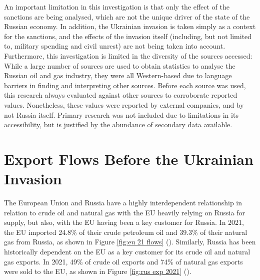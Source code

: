 \documentclass[12pt]{article}
\begin{document}
 An important limitation in this investigation is that only the effect of the sanctions are being analysed, which are not the unique driver of the state of the Russian economy. In addition, the Ukrainian invasion is taken simply as a context for the sanctions, and the effects of the invasion itself (including, but not limited to, military spending and civil unrest) are not being taken into account. Furthermore, this investigation is limited in the diversity of the sources accessed: While a large number of sources are used to obtain statistics to analyse the Russian oil and gas industry, they were all Western-based due to language barriers in finding and interpreting other sources. Before each source was used, this research always evaluated against other sources to corroborate reported values. Nonetheless, these values were reported by external companies, and by not Russia itself. Primary research was not included due to limitations in its accessibility, but is justified by the abundance of secondary data available. 


\section{Export Flows Before the Ukrainian Invasion}
The European Union and Russia have a highly interdependent relationship in relation to crude oil and natural gas with the EU heavily relying on Russia for supply, but also, with the EU having been a key customer for Russia. In 2021, the EU imported 24.8\% of their crude petroleum oil and 39.3\% of their natural gas from Russia, as shown in Figure \ref{fig:eu 21 flows} (\citeauthor{eurostat_2022}). Similarly, Russia has been historically dependent on the EU as a key customer for its crude oil and natural gas exports. In 2021, 49\% of crude oil exports and 74\% of natural gas exports were sold to the EU, as shown in Figure \ref{fig:rus exp 2021} (\citeauthor{eia_2022}). 
\end{document}

